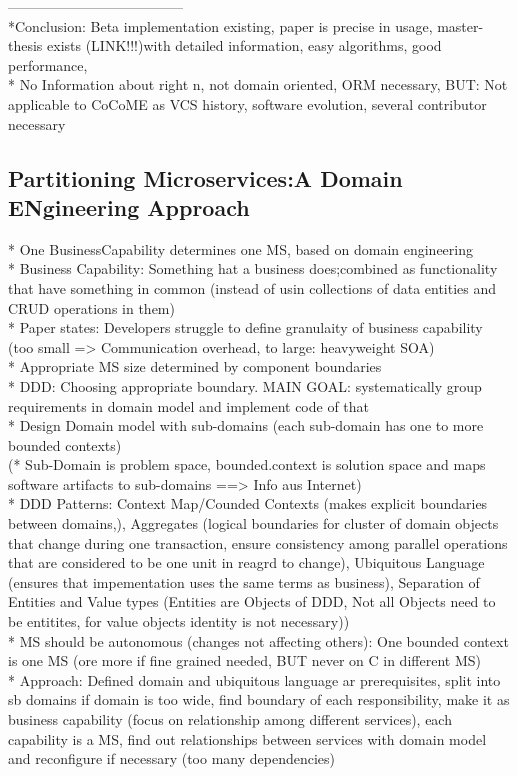 --------------------------------------\\
*Conclusion: Beta implementation existing, paper is precise in usage, master-thesis exists (LINK!!!)with detailed information, easy algorithms, good performance, \\
* No Information about right n, not domain oriented, ORM necessary,
BUT: Not applicable to CoCoME as VCS history, software evolution, several contributor necessary\\



\subsection{Partitioning Microservices:A Domain ENgineering Approach}

* One BusinessCapability determines one MS, based on domain engineering\\
* Business Capability: Something hat a business does;combined as functionality that have something in common (instead of usin collections of data entities and CRUD operations in them)\\
* Paper states: Developers struggle to define granulaity of business capability (too small => Communication overhead, to large: heavyweight SOA)\\
* Appropriate MS size determined by component boundaries\\
* DDD: Choosing appropriate boundary. MAIN GOAL: systematically group requirements in domain model and implement code  of that\\
* Design Domain model with sub-domains (each sub-domain has one to more bounded contexts)\\
(* Sub-Domain is problem space, bounded.context is solution space and maps software artifacts to sub-domains ==> Info aus Internet)\\
* DDD Patterns: Context Map/Counded Contexts (makes explicit boundaries between domains,), Aggregates (logical boundaries for cluster of domain objects that change during one transaction, ensure consistency among parallel operations that are considered to be one unit in reagrd to change), Ubiquitous Language (ensures that impementation uses the same terms as business), Separation of Entities and Value types (Entities are Objects of DDD, Not all Objects need to be entitites, for value objects identity is not necessary))\\
* MS should be autonomous (changes not affecting others): One bounded context is one MS (ore more if fine grained needed, BUT never on C in different MS)\\
* Approach: Defined domain and ubiquitous language ar prerequisites, split into sb domains if domain is too wide, find boundary of each responsibility, make it as business capability (focus on relationship among different services), each capability is a MS, find out relationships between services with domain model and reconfigure if necessary (too many dependencies)\\


